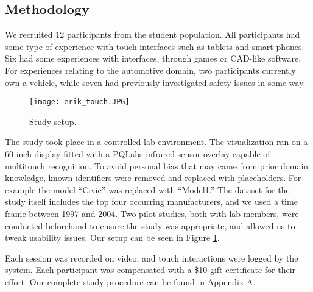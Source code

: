 


\subsection{Methodology}
We recruited 12 participants from the student population. All participants had some
type of experience with touch interfaces such as tablets and smart phones. Six 
had some experiences with \threed interfaces, through games or CAD-like
software. For experiences relating to the automotive domain, two participants
currently own a vehicle, while seven had previously investigated safety issues in
some way. 
 
	\begin{figure}
	 \centering  
	 \texttt{[image: erik\_touch.JPG]}  
	 \caption{Study setup.}
	 \label{figure:study}
	\end{figure}


The study took place in a controlled lab environment. The visualization ran on
a 60 inch display fitted with a PQLabs infrared sensor overlay capable of
multitouch recognition. To avoid personal bias that may came from prior domain
knowledge, known identifiers were removed and replaced with placeholders.
For example the model ``Civic'' was replaced with ``Model1.'' The dataset for
the study itself includes the top four occurring manufacturers, and we used a time
frame between 1997 and 2004. Two pilot studies, both with lab members, were
conducted beforehand to ensure the study was appropriate, and allowed us to
tweak usability issues. Our setup can be seen in Figure \ref{figure:study}.

Each session was recorded on video, and touch interactions were
logged by the system. Each participant was compensated with a \$10 gift
certificate for their effort. Our complete study procedure can be found in Appendix A.


